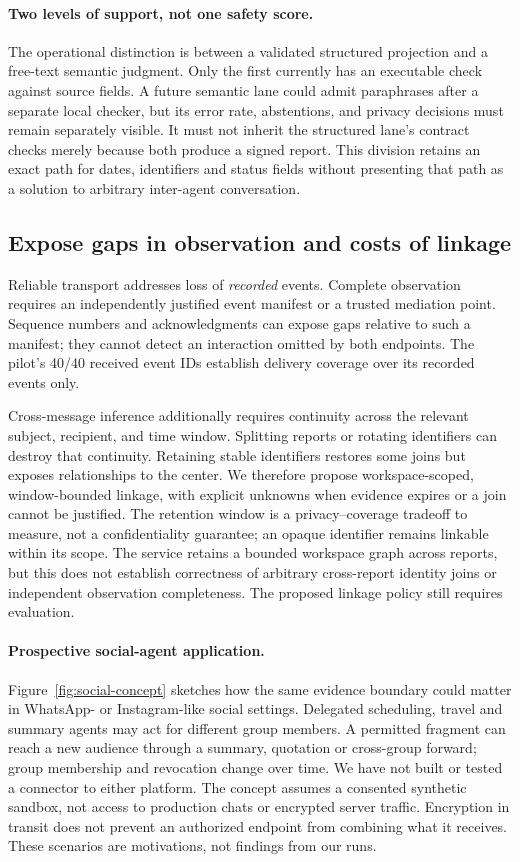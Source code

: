 \paragraph{Two levels of support, not one safety score.}
The operational distinction is between a validated structured projection and a
free-text semantic judgment. Only the first currently has an executable check
against source fields. A future semantic lane could admit paraphrases after a
separate local checker, but its error rate, abstentions, and privacy decisions
must remain separately visible. It must not inherit the structured lane's
contract checks merely because both produce a signed report. This division
retains an exact path for dates, identifiers and status fields without presenting
that path as a solution to arbitrary inter-agent conversation.

\subsection{Expose gaps in observation and costs of linkage}
Reliable transport addresses loss of \emph{recorded} events. Complete observation
requires an independently justified event manifest or a trusted mediation point.
Sequence numbers and acknowledgments can expose gaps relative to such a manifest;
they cannot detect an interaction omitted by both endpoints. The pilot's 40/40
received event IDs establish delivery coverage over its recorded events only.

Cross-message inference additionally requires continuity across the relevant
subject, recipient, and time window. Splitting reports or rotating identifiers
can destroy that continuity. Retaining stable identifiers restores some joins
but exposes relationships to the center. We therefore propose workspace-scoped,
window-bounded linkage, with explicit unknowns when evidence expires or a join
cannot be justified. The retention window is a privacy--coverage tradeoff to
measure, not a confidentiality guarantee; an opaque identifier remains linkable
within its scope. The service retains a bounded workspace graph across reports, but this does not
establish correctness of arbitrary cross-report identity joins or independent
observation completeness. The proposed linkage policy still requires evaluation.

\paragraph{Prospective social-agent application.}
Figure~\ref{fig:social-concept} sketches how the same evidence boundary could
matter in WhatsApp- or Instagram-like social settings. Delegated scheduling,
travel and summary agents may act for different group members. A permitted
fragment can reach a new audience through a summary, quotation or cross-group
forward; group membership and revocation change over time. We have not built
or tested a connector to either platform. The concept assumes a consented
synthetic sandbox, not access to production chats or encrypted server traffic.
Encryption in transit does not prevent an authorized endpoint from combining
what it receives. These scenarios are motivations, not findings from our runs.



